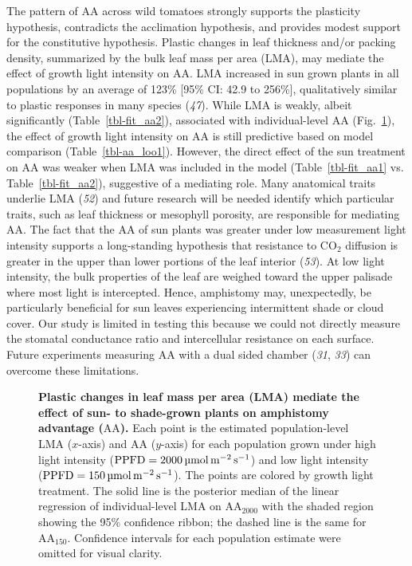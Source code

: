 \documentclass[
  letterpaper,
  DIV=11,
  numbers=noendperiod]{scrartcl}
\makeatletter
\newcommand*\pandocbounded[1]{%
  \sbox\pandoc@box{#1}%
  \Gscale@div\@tempa{\textheight}{\dimexpr\ht\pandoc@box+\dp\pandoc@box\relax}%
  \Gscale@div\@tempb{\linewidth}{\wd\pandoc@box}%
  \ifdim\@tempb\p@<\@tempa\p@\let\@tempa\@tempb\fi%
  \ifdim\@tempa\p@<\p@\scalebox{\@tempa}{\usebox\pandoc@box}%
  \else\usebox{\pandoc@box}%
  \fi%
}
\newcommand{\aahigh}{\mathrm{AA}_{2000}}
\newcommand{\aalow}{\mathrm{AA}_{150}}
\newcommand{\aax}{$\mathrm{AA}$}
\newcommand{\ppfdequals}[1]{$\mathrm{PPFD} = \qty{#1}{\micro\mol\raiseto{-2}\meter\raiseto{-1}\second}$}
\makeatother
\begin{document}
The pattern of \aax{} across wild tomatoes strongly supports the
plasticity hypothesis, contradicts the acclimation hypothesis, and
provides modest support for the constitutive hypothesis. Plastic changes
in leaf thickness and/or packing density, summarized by the bulk leaf
mass per area (LMA), may mediate the effect of growth light intensity on
\aax{}. LMA increased in sun grown plants in all populations by an
average of 123\% {[}95\% CI: 42.9 to 256\%{]}, qualitatively similar to
plastic responses in many species (\emph{47}). While LMA is weakly,
albeit significantly (Table~\ref{tbl-fit_aa2}), associated with
individual-level \aax{} (Fig.~\ref{fig-lma_aa}), the effect of growth
light intensity on \aax{} is still predictive based on model comparison
(Table~\ref{tbl-aa_loo1}). However, the direct effect of the sun
treatment on \aax{} was weaker when LMA was included in the model
(Table~\ref{tbl-fit_aa1} vs. Table~\ref{tbl-fit_aa2}), suggestive of a
mediating role. Many anatomical traits underlie LMA (\emph{52}) and
future research will be needed identify which particular traits, such as
leaf thickness or mesophyll porosity, are responsible for mediating
\aax{}. The fact that the \aax{} of sun plants was greater under low
measurement light intensity supports a long-standing hypothesis that
resistance to CO\(_2\) diffusion is greater in the upper than lower
portions of the leaf interior (\emph{53}). At low light intensity, the
bulk properties of the leaf are weighed toward the upper palisade where
most light is intercepted. Hence, amphistomy may, unexpectedly, be
particularly beneficial for sun leaves experiencing intermittent shade
or cloud cover. Our study is limited in testing this because we could
not directly measure the stomatal conductance ratio and intercellular
resistance on each surface. Future experiments measuring \aax{} with a
dual sided chamber (\emph{31}, \emph{33}) can overcome these
limitations.

\begin{figure}

\centering{

\pandocbounded{\texttt{[image: ms\_files/figure-pdf/fig-lma\_aa-1.pdf]}}

}

\caption{\label{fig-lma_aa}\textbf{Plastic changes in leaf mass per area (LMA) mediate the effect of sun- to shade-grown plants on amphistomy advantage (\aax{}).}
Each point is the estimated population-level LMA (\(x\)-axis) and \aax{}
(\(y\)-axis) for each population grown under high light intensity
(\ppfdequals{2000}) and low light intensity (\ppfdequals{150}). The
points are colored by growth light treatment. The solid line is the
posterior median of the linear regression of individual-level LMA on
\(\aahigh\) with the shaded region showing the 95\% confidence ribbon;
the dashed line is the same for \(\aalow\). Confidence intervals for
each population estimate were omitted for visual clarity.}

\end{figure}%
\end{document}
